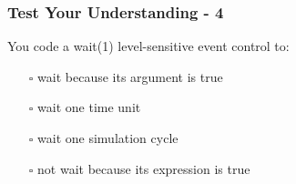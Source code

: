 \documentclass[t, notes, xcolor=table]{beamer}
\begin{document}
\begin{frame}
\frametitle{Test Your Understanding - 4}
You code a wait(1) level-sensitive event control to:
\begin{itemize}
\item[$\square$] wait because its argument is true
\item[$\square$] wait one time unit
\item[$\square$] wait one simulation cycle
\item[$\square$] not wait because its expression is true
\end{itemize}
\end{frame}
\end{document}
